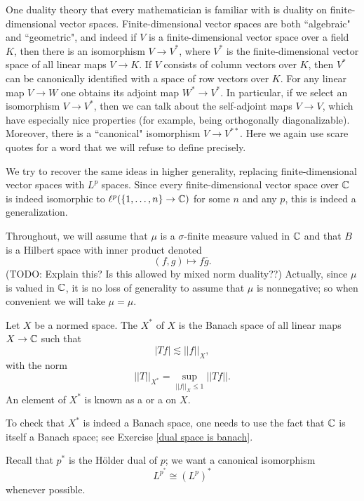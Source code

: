 One duality theory that every mathematician is familiar with is duality on finite-dimensional vector spaces.
Finite-dimensional vector spaces are both ``algebraic" and ``geometric", and indeed if $V$ is a finite-dimensional vector space over a field $K$, then there is an isomorphism $V \to V^*$, where $V^*$ is the finite-dimensional vector space of all linear maps $V \to K$.
If $V$ consists of column vectors over $K$, then $V^*$ can be canonically identified with a space of row vectors over $K$.
For any linear map $V \to W$ one obtains its adjoint map $W^* \to V^*$.
In particular, if we select an isomorphism $V \to V^*$, then we can talk about the self-adjoint maps $V \to V$, which have especially nice properties (for example, being orthogonally diagonalizable).
Moreover, there is a ``canonical" isomorphism $V \to V^{**}$.
Here we again use scare quotes for a word that we will refuse to define precisely.

We try to recover the same ideas in higher generality, replacing finite-dimensional vector spaces with $L^p$ spaces.
Since every finite-dimensional vector space over $\mathbb{C}$ is indeed isomorphic to $\ell^p(\{1, \dots, n\} \to \mathbb{C})$ for some $n$ and any $p$, this is indeed a generalization.

Throughout, we will assume that $\mu$ is a $\sigma$-finite measure valued in $\mathbb{C}$ and that $B$ is a Hilbert space with inner product denoted
\[(f, g) \mapsto f \overline g.\]
(TODO: Explain this? Is this allowed by mixed norm duality??)
Actually, since $\mu$ is valued in $\mathbb{C}$, it is no loss of generality to assume that $\mu$ is nonnegative; so when convenient we will take $\mu = \mu$.

\begin{definition}
Let $X$ be a normed space.
The  $X^*$ of $X$ is the Banach space of all linear maps $X \to \mathbb{C}$ such that
\begin{equation}
\label{bounded covector}
|Tf| \lesssim ||f||_X,
\end{equation}
with the norm
\[||T||_{X^*} = \sup_{||f||_X \leq 1} ||Tf||.\]
An element of $X^*$ is known as a  or a  on $X$.
\end{definition}

To check that $X^*$ is indeed a Banach space, one needs to use the fact that $\mathbb{C}$ is itself a Banach space; see Exercise \ref{dual space is banach}.

Recall that $p^*$ is the H\"older dual of $p$; we want a canonical isomorphism
\[L^{p^*} \cong (L^p)^*\]
whenever possible.

